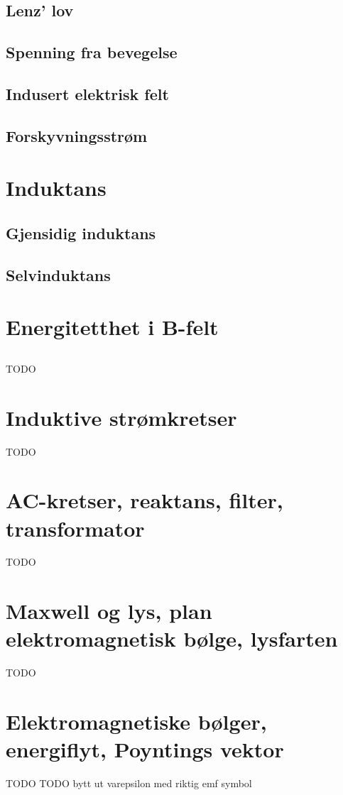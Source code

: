 \documentclass{article}
\begin{document}
    \subsection{Lenz' lov}
      
    \subsection{Spenning fra bevegelse} %
      
    \subsection{Indusert elektrisk felt}
      
    \subsection{Forskyvningsstrøm}
      
  \section{Induktans}
    \subsection{Gjensidig induktans}
      
    \subsection{Selvinduktans}
      
  \section{Energitetthet i B-felt}
    \subsection{}
      TODO
  \section{Induktive strømkretser}
    TODO
  \section{AC-kretser, reaktans, filter, transformator}
    TODO
  \section{Maxwell og lys, plan elektromagnetisk bølge, lysfarten}
    TODO
  \section{Elektromagnetiske bølger, energiflyt, Poyntings vektor}
    TODO
  TODO bytt ut varepsilon med riktig emf symbol
\end{document}
